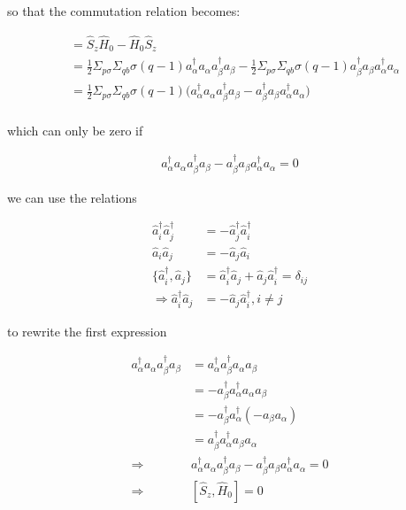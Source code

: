 \documentclass[twoside]{article}
\begin{document}
so that the commutation relation becomes:

\begin{align*}
[\hat{S}_z, \hat{H}_0] &= \hat{S}_z \hat{H}_0 - \hat{H}_0  \hat{S}_z \\
&= \frac{1}{2} \Sigma_{p\sigma}  \Sigma_{qb} \sigma (q-1) a_\alpha^\dagger a_\alpha  a_\beta^\dagger a_\beta - \frac{1}{2} \Sigma_{p\sigma}  \Sigma_{qb} \sigma (q-1) a_\beta^\dagger a_\beta a_\alpha^\dagger a_\alpha \\
&= \frac{1}{2} \Sigma_{p\sigma}  \Sigma_{qb} \sigma (q-1) \big( a_\alpha^\dagger a_\alpha  a_\beta^\dagger a_\beta - a_\beta^\dagger a_\beta a_\alpha^\dagger a_\alpha \big) \\
\end{align*}

which can only be zero if

\begin{align*}
a_\alpha^\dagger a_\alpha  a_\beta^\dagger a_\beta - a_\beta^\dagger a_\beta a_\alpha^\dagger a_\alpha = 0
\end{align*}

we can use the relations 

\begin{align*}
\hat{a}_i^\dag \hat{a}_j^\dag &= -\hat{a}_j^\dag \hat{a}_i^\dag \\
\hat{a}_i \hat{a}_j &= -\hat{a}_j \hat{a}_i \\
\lbrace \hat{a}_i^\dag, \hat{a}_j \rbrace &= \hat{a}_i^\dag \hat{a}_j + \hat{a}_j \hat{a}_i^\dag = \delta_{ij} \\
\Rightarrow \hat{a}_i^\dag \hat{a}_j &= -\hat{a}_j \hat{a}_i^\dag, i\neq j
\end{align*}

to rewrite the first expression

\begin{align*}
a_\alpha^\dagger a_\alpha  a_\beta^\dagger a_\beta &= a_\alpha^\dagger  a_\beta^\dagger a_\alpha  a_\beta \\
&= -a_\beta^\dagger a_\alpha^\dagger a_\alpha  a_\beta \\
&= -a_\beta^\dagger a_\alpha^\dagger (-a_\beta a_\alpha )  \\
&= a_\beta^\dagger a_\alpha^\dagger a_\beta a_\alpha \\
\Rightarrow &a_\alpha^\dagger a_\alpha  a_\beta^\dagger a_\beta - a_\beta^\dagger a_\beta a_\alpha^\dagger a_\alpha = 0 \\
\Rightarrow  &[\hat{S}_z, \hat{H}_0]  = 0
\end{align*}
\end{document}
